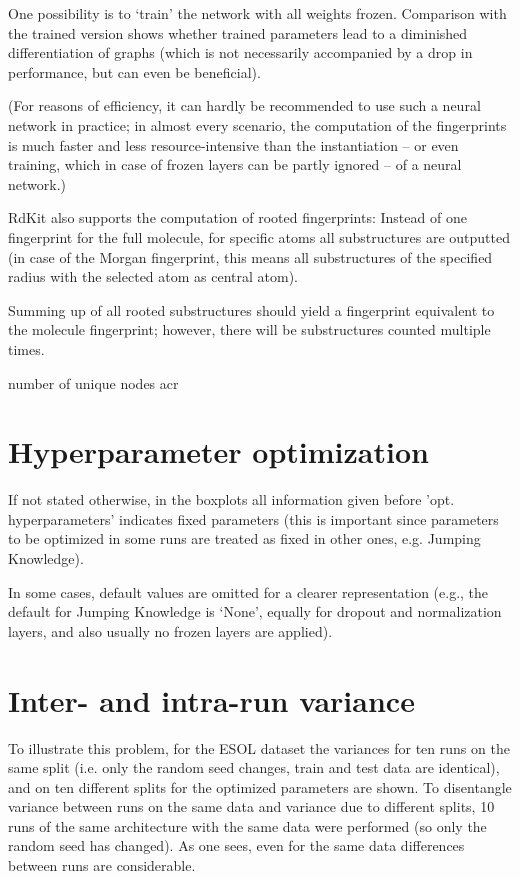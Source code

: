 One possibility is to ‘train’ the network with all weights frozen.
Comparison with the trained version shows whether trained parameters lead to a diminished differentiation of graphs (which is not necessarily accompanied by a drop in performance, but can even be beneficial).

(For reasons of efficiency, it can hardly be recommended to use such a neural network in practice; in almost every scenario, the computation of the fingerprints is much faster and less resource-intensive than the instantiation – or even training, which in case of frozen layers can be partly ignored – of a neural network.)


RdKit also supports the computation of rooted fingerprints: Instead of one fingerprint for the full molecule, for specific atoms all substructures are outputted (in case of the Morgan fingerprint, this means all substructures of the specified radius with the selected atom as central atom).

Summing up of all rooted substructures should yield a fingerprint equivalent to the molecule fingerprint; however, there will be substructures counted multiple times.


number of unique nodes acr

\section{Hyperparameter optimization}

If not stated otherwise, in the boxplots all information given before 'opt. hyperparameters' indicates fixed parameters (this is important since parameters to be optimized in some runs are treated as fixed in other ones, e.g. Jumping Knowledge).

In some cases, default values are omitted for a clearer representation (e.g., the default for Jumping Knowledge is ‘None’, equally for dropout and normalization layers, and also usually no frozen layers are applied).

\section{Inter- and intra-run variance}

To illustrate this problem, for the ESOL dataset the variances for ten runs on the same split (i.e. only the random seed changes, train and test data are identical), and on ten different splits for the optimized parameters are shown.
To disentangle variance between runs on the same data and variance due to different splits, 10 runs of the same architecture with the same data were performed (so only the random seed has changed).
As one sees, even for the same data differences between runs are considerable.


